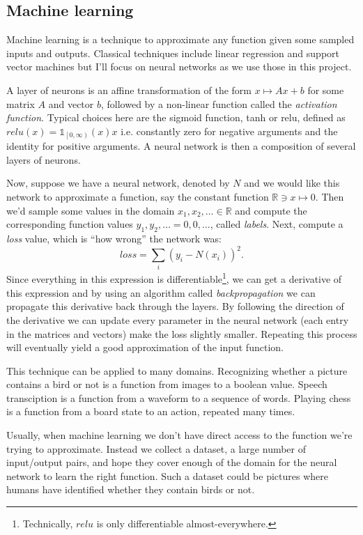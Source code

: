 \documentclass{article}
\theoremstyle{changedot}
\theoremstyle{changedotbreak}
\theoremstyle{nonumberplain}
\newcommand{\m}{\mathbb}
\begin{document}
\subsection{Machine learning}
Machine learning is a technique to approximate any function given some sampled inputs and outputs. Classical techniques include linear regression and support vector machines but I'll focus on neural networks as we use those in this project.

A layer of neurons is an affine transformation of the form $x \mapsto Ax + b$ for some matrix $A$ and vector $b$, followed by a non-linear function called the \emph{activation function}. Typical choices here are the sigmoid function, tanh or relu, defined as $relu(x) = \mathds{1}_{\left[0,\infty\right)}(x) x$ i.e. constantly zero for negative arguments and the identity for positive arguments. A neural network is then a composition of several layers of neurons.

Now, suppose we have a neural network, denoted by $N$ and we would like this network to approximate a function, say the constant function $\m R \ni x \mapsto 0$. Then we'd sample some values in the domain $x_{1}, x_{2}, \dots \in \m R$ and compute the corresponding function values $y_{1}, y_{2}, \dots = 0, 0, \dots$, called \emph{labels}. Next, compute a \emph{loss} value, which is ``how wrong'' the network was: \[loss = \sum_{i} (y_{i} - N(x_{i}))^{2}.\] Since everything in this expression is differentiable\footnote{Technically, $relu$ is only differentiable almost-everywhere.}, we can get a derivative of this expression and by using an algorithm called \emph{backpropagation} we can propagate this derivative back through the layers. By following the direction of the derivative we can update every parameter in the neural network (each entry in the matrices and vectors) make the loss slightly smaller. Repeating this process will eventually yield a good approximation of the input function.

This technique can be applied to many domains. Recognizing whether a picture contains a bird or not is a function from images to a boolean value. Speech transciption is a function from a waveform to a sequence of words. Playing chess is a function from a board state to an action, repeated many times.

Usually, when machine learning we don't have direct access to the function we're trying to approximate. Instead we collect a dataset, a large number of input/output pairs, and hope they cover enough of the domain for the neural network to learn the right function. Such a dataset could be pictures where humans have identified whether they contain birds or not.
\end{document}
